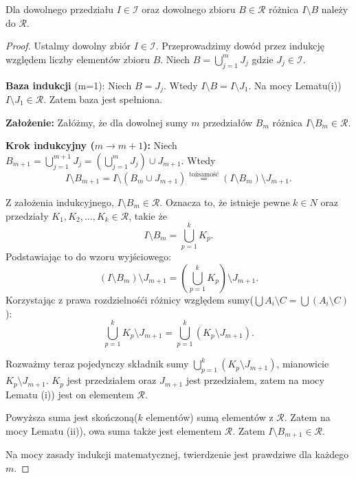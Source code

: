 \begin{lemma}
	Dla dowolnego przedziału $I\in \mathcal{I}$ oraz dowolnego zbioru $B\in \mathcal{R}$ różnica $I\setminus B$ należy do $\mathcal{R}$.
\end{lemma} 
\begin{proof}
	Ustalmy dowolny zbiór $I\in \mathcal{I}$. Przeprowadzimy dowód przez indukcję względem liczby elementów zbioru $B$. Niech $B = \bigcup_{j=1} ^{m}J_{j}$ gdzie $J_{j}\in \mathcal{I}$.

\textbf{Baza indukcji} (m=1): Niech $B= J_{j}$. Wtedy $I\setminus B = I\setminus J_1$. Na mocy Lematu(i)) $I\setminus J_1 \in \mathcal{R}$. Zatem baza jest spełniona.

\textbf{Założenie:} Załóżmy, że dla dowolnej sumy $m$ przedziałów $B_{m}$ różnica $I\setminus B_{m}\in \mathcal{R}$.

\textbf{Krok indukcyjny ($m\to m+1$):} Niech $B_{m+1}= \bigcup_{j=1} ^{m+1}J_{j} = \left( \bigcup_{j=1} ^{m} J_{j}\right) \cup J_{m+1} $. Wtedy
\[
I\setminus B_{m+1} = I\setminus \left( B_{m}\cup J_{m+1} \right) \overset{\text{tożsamość}}{=} \left( I\setminus B_{m} \right) \setminus J_{m+1}
.\] 
    
Z założenia indukcyjnego, $I\setminus B_{m}\in \mathcal{R}$. Oznacza to, że istnieje pewne $k\in N$ oraz przedziały  $K_1,K_2,\ldots,K_{k}\in \mathcal{R}$, takie że
\[
I\setminus B_{m} = \bigcup_{p=1}^{k}K_{p}
.\] 
Podstawiając to do wzoru wyjściowego:
\[
	\left( I\setminus B_{m} \right) \setminus J_{m+1} = \left( \bigcup_{p=1} ^{k}K_{p} \right) \setminus J_{m+1}
.\] 
Korzystając z prawa rozdzielnośći różnicy względem sumy($\bigcup A_{i} \setminus C = \bigcup \left( A_{i} \setminus C\right)$ ):
\[
\bigcup_{p=1} ^{k}K_{p}\setminus J_{m+1} = \bigcup_{p=1} ^{k}\left( K_{p}\setminus J_{m+1} \right) 
.\] 

Rozważmy teraz pojedynczy składnik sumy $\bigcup_{p=1} ^{k}\left( K_{p}\setminus J_{m+1} \right) $, mianowicie $K_{p}\setminus J_{m+1}$. $K_{p}$ jest przedziałem oraz $J_{m+1}$ jest przedziałem, zatem na mocy Lematu (i)) jest on elementem $\mathcal{R}$. 

Powyższa suma jest skończoną($k$ elementów) sumą elementów z $\mathcal{R}$. Zatem na mocy Lematu (ii)), owa suma także jest elementem $\mathcal{R}$. Zatem $I\setminus B_{m+1} \in \mathcal{R}$.

Na mocy zasady indukcji matematycznej, twierdzenie jest prawdziwe dla każdego $m$.
\end{proof} 

